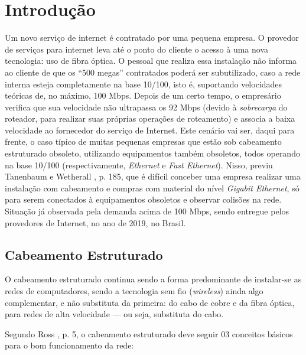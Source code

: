 \documentclass[	DIV=calc,%
							paper=a4,%
							fontsize=12pt,%
							onecolumn]{scrartcl}	 					%
\begin{document}
\clearpage
\renewcommand{\contentsname}{Sumário}
\tableofcontents
\clearpage

\section{Introdução}

Um novo serviço de internet é contratado por uma pequena empresa. O provedor de serviços para internet leva até o ponto do cliente o acesso à uma nova tecnologia: uso de fibra óptica. O pessoal que realiza essa instalação não informa ao cliente de que os ``500 megas'' contratados poderá ser subutilizado, caso a rede interna esteja completamente na base 10/100, isto é, suportando velocidades teóricas de, no máximo, 100 Mbps. Depois de um certo tempo, o empresário verifica que sua velocidade não ultrapassa os 92 Mbps (devido à \textit{sobrecarga} do roteador, para realizar suas próprias operações de roteamento) e associa a baixa velocidade ao fornecedor do serviço de Internet. Este cenário vai ser, daqui para frente, o caso típico de muitas pequenas empresas que estão sob cabeamento estruturado obsoleto, utilizando equipamentos também obsoletos, todos operando na base 10/100 (respectivamente, \textit{Ethernet} e \textit{Fast Ethernet}). Nisso, previu Tanenbaum e Wetherall \cite{t2013}, p. 185, que é difícil conceber uma empresa realizar uma instalação com cabeamento e compras com material do nível \textit{Gigabit Ethernet}, só para serem conectados à equipamentos obsoletos e observar colisões na rede. Situação já observada pela demanda acima de 100 Mbps, sendo entregue pelos provedores de Internet, no ano de 2019, no Brasil.

\subsection{Cabeamento Estruturado}

O cabeamento estruturado continua sendo a forma predominante de instalar-se as redes de computadores, sendo a tecnologia sem fio (\textit{wireless}) ainda algo complementar, e não substituta da primeira: do cabo de cobre e da fibra óptica, para redes de alta velocidade --- ou seja, substituta do cabo.

Segundo Ross \cite{ross2007cabeamento}, p. 5, o cabeamento estruturado deve seguir 03 conceitos básicos para o bom funcionamento da rede:
\end{document}
